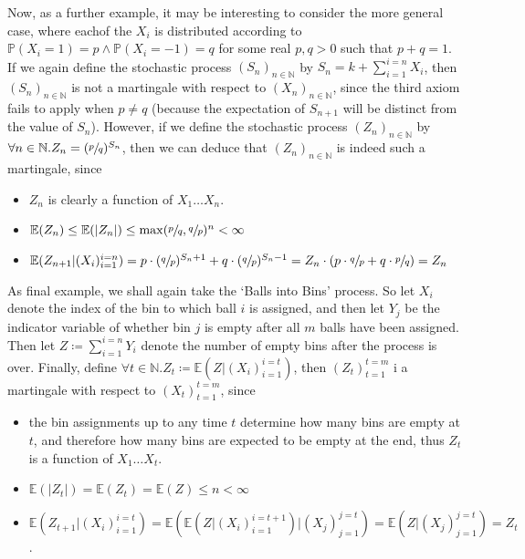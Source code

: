 	Now, as a further example, it may be interesting to consider the more general case, where 
	eachof the $X_i$ is distributed according to $\mathbb{P}(X_i=1) = p \land \mathbb{P}(X_i=-1
	) = q$ for some real $p,q > 0$ such that $p+q=1$.\\
	If we again define the stochastic process $(S_n)_{n\in\mathbb{N}}$ by $S_n = k + 
	\sum_{i=1}^{i=n} X_i$, then $(S_n)_{n\in\mathbb{N}}$ is not a martingale with respect to $(
	X_n)_{n\in\mathbb{N}}$, since the third axiom fails to apply when $p\neq q$ (because the 
	expectation of $S_{n+1}$ will be distinct from the value of $S_n$). However, if we define 
	the stochastic process $(Z_n)_{n\in\mathbb{N}}$ by $\forall n \in \mathbb{N} . Z_n = 
	(\sfrac{p}{q})^{S_n}$, then we can deduce that $(Z_n)_{n \in \mathbb{N}}$ is indeed such a 
	martingale, since
	\begin{itemize}
		\item $Z_n$ is clearly a function of $X_1 \hdots X_n$.
		\item $\mathbb{E}(Z_n) \leq \mathbb{E}(|Z_n|) \leq \max(\sfrac{p}{q}, 
		\sfrac{q}{p})^n < \infty$
		\item $\mathbb{E}(Z_{n+1} | (X_i)_{i=1}^{i=n}) = p\cdot(\sfrac{q}{p})^{S_n + 1}
		+q\cdot(\sfrac{q}{p})^{S_n-1} = Z_n \cdot (p\cdot \sfrac{q}{p} + 
		q\cdot\sfrac{p}{q}) = Z_n$
	\end{itemize}

	As final example, we shall again take the `Balls into Bins' process. So let $X_i$ denote 
	the index of the bin to which ball $i$ is assigned, and then let $Y_j$ be the indicator
	variable of whether bin $j$ is empty after all $m$ balls have been assigned. Then let 
	$Z \coloneqq \sum_{i=1}^{i=n} Y_i$ denote the number of empty bins after the process is 
	over. Finally, define $\forall t \in \mathbb{N} . Z_t \coloneqq \mathbb{E}(Z | (X_i)_{i=1
	}^{i=t})$, then $(Z_t)_{t=1}^{t=m}$ i a martingale with respect to $(X_t)_{t=1}^{t=m}$, 
	since
	\begin{itemize}
		\item the bin assignments up to any time $t$ determine how many bins are empty at $
		t$, and therefore how many bins are expected to be empty at the end, thus $Z_t$ is 
		a function of $X_1\hdots X_t$.
		\item $\mathbb{E}(|Z_t|) = \mathbb{E}(Z_t) = \mathbb{E}(Z) \leq n < \infty$
		\item $\mathbb{E}(Z_{t+1} | (X_i)_{i=1}^{i=t}) = 
		\mathbb{E}\left(\mathbb{E}\left(Z|(X_i)_{i=1}^{i=t+1}\right)| (X_j)_{j=1}^{j=t}\right) =
		\mathbb{E}(Z | (X_j)_{j=1}^{j=t}) =  Z_t$.
	\end{itemize}

